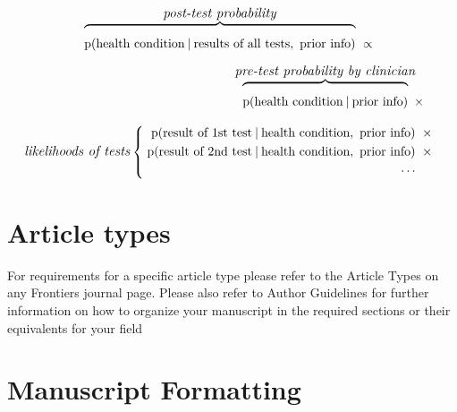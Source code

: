 \documentclass[utf8]{FrontiersinHarvard} %
\providecommand{\href}[2]{#2}
\newcommand*{\p}{\mathrm{p}}%
\renewcommand*{\|}[1][]{\nonscript\:#1\vert\nonscript\:\mathopen{}}
\newcommand*{\zerob}[1]{\makebox[0pt][c]{#1}}
\begin{document}
\begin{multline}\label{eq:bayes_theorem_intro}
    \overbrace{\vphantom{\bigg\{}\p(\text{health condition}\|
      \text{results of all tests},\ 
      \text{prior info})}^{\zerob{\scriptsize\emph{post-test probability}}}
    \mathrel{\ \propto\ }{}
    \\
    \shoveright{\overbrace{\vphantom{\bigg\{}\p(\text{health condition} \|
      \text{prior info})}^{\zerob{\scriptsize\emph{pre-test probability by clinician}}}
  \mathbin{\ \times\ }{}}    
    \\[\jot]
\text{\scriptsize\emph{likelihoods of tests}}\left\{\;  \begin{aligned}
 \p(\text{result of 1st test} \| \text{health condition} ,\ 
  \text{prior info})
  &\mathbin{\ \times\ }{}\\
  \p(\text{result of 2nd test} \| \text{health condition} ,\ 
  \text{prior info})
  &\mathbin{\ \times\ }{}
\\
{}\dotsb &
  \end{aligned}\right.
\end{multline}






\section{Article types}

For requirements for a specific article type please refer to the Article Types on any Frontiers journal page. Please also refer to  \href{http://home.frontiersin.org/about/author-guidelines#Sections}{Author Guidelines} for further information on how to organize your manuscript in the required sections or their equivalents for your field


\section{Manuscript Formatting}
\end{document}
